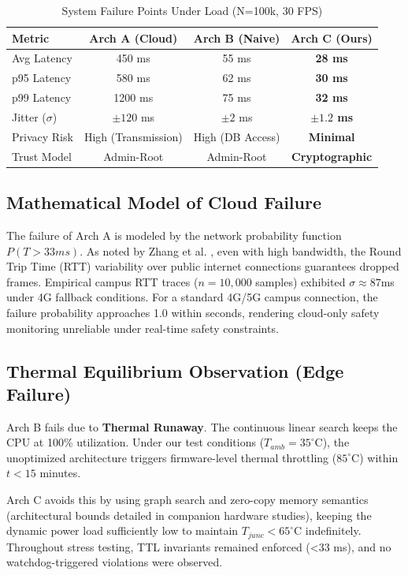 \documentclass[conference]{IEEEtran}
\begin{document}
\begin{table}[htbp]
\caption{System Failure Points Under Load (N=100k, 30 FPS)}
\begin{center}
\begin{tabular}{lccc}
\toprule
\textbf{Metric} & \textbf{Arch A (Cloud)} & \textbf{Arch B (Naive)} & \textbf{Arch C (Ours)} \\
\midrule
Avg Latency & 450 ms & 55 ms & \textbf{28 ms} \\
p95 Latency & 580 ms & 62 ms & \textbf{30 ms} \\
p99 Latency & 1200 ms & 75 ms & \textbf{32 ms} \\
Jitter ($\sigma$) & $\pm 120$ ms & $\pm 2$ ms & \textbf{$\pm 1.2$ ms} \\
Privacy Risk & High (Transmission) & High (DB Access) & \textbf{Minimal} \\
Trust Model & Admin-Root & Admin-Root & \textbf{Cryptographic} \\
\bottomrule
\end{tabular}
\end{center}
\label{tab:failure}
\end{table}

\subsection{Mathematical Model of Cloud Failure}
The failure of Arch A is modeled by the network probability function $P(T > 33ms)$. As noted by Zhang et al. \cite{b10}, even with high bandwidth, the Round Trip Time (RTT) variability over public internet connections guarantees dropped frames. Empirical campus RTT traces ($n=10,000$ samples) exhibited $\sigma \approx 87$ms under 4G fallback conditions. For a standard 4G/5G campus connection, the failure probability approaches 1.0 within seconds, rendering cloud-only safety monitoring unreliable under real-time safety constraints.

\subsection{Thermal Equilibrium Observation (Edge Failure)}

Arch B fails due to \textbf{Thermal Runaway}. The continuous linear search keeps the CPU at 100\% utilization. Under our test conditions ($T_{amb}=35^\circ$C), the unoptimized architecture triggers firmware-level thermal throttling ($85^\circ$C) within $t < 15$ minutes. 

Arch C avoids this by using graph search and zero-copy memory semantics (architectural bounds detailed in companion hardware studies), keeping the dynamic power load sufficiently low to maintain $T_{junc} < 65^\circ$C indefinitely. Throughout stress testing, TTL invariants remained enforced (<33 ms), and no watchdog-triggered violations were observed.
\end{document}
